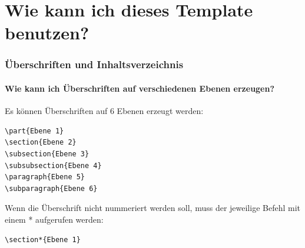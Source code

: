 \documentclass[12pt]{article}
\begin{document}
\part{Wie kann ich dieses Template benutzen?}

\section{Überschriften und Inhaltsverzeichnis}

\subsection{Wie kann ich Überschriften auf verschiedenen Ebenen erzeugen?}
Es können Überschriften auf 6 Ebenen erzeugt werden:
\begin{verbatim}
\part{Ebene 1}
\section{Ebene 2}
\subsection{Ebene 3}
\subsubsection{Ebene 4}
\paragraph{Ebene 5}
\subparagraph{Ebene 6}
\end{verbatim}

\noindent Wenn die Überschrift nicht nummeriert werden soll, muss der jeweilige Befehl mit einem * aufgerufen werden:
\begin{verbatim}
\section*{Ebene 1}
\end{verbatim}
\end{document}
